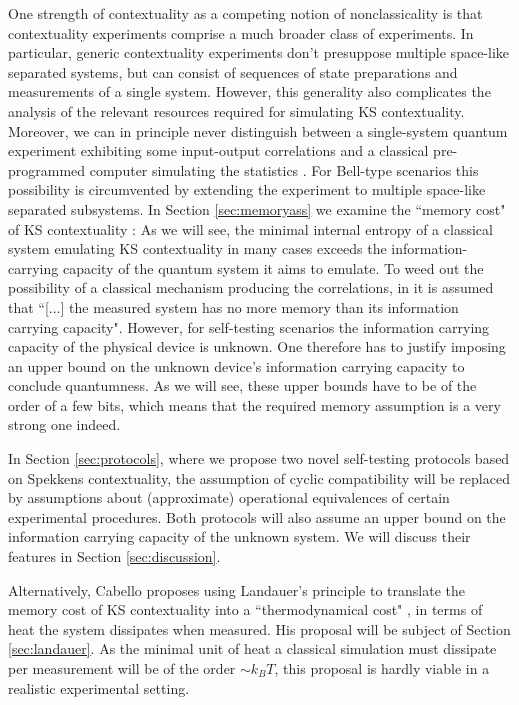 One strength of contextuality as a competing notion of nonclassicality is that contextuality experiments comprise a much broader class of experiments. In particular, generic contextuality experiments don't presuppose multiple space-like separated systems, but can consist of sequences of state preparations and measurements of a single system. However, this generality also complicates the analysis of the relevant resources required for simulating KS contextuality. Moreover, we can in principle never distinguish between a single-system quantum experiment exhibiting some input-output correlations and a classical pre-programmed computer simulating the statistics \cite{Supic2020}. For Bell-type scenarios this possibility is circumvented by extending the experiment to multiple space-like separated subsystems. In Section \ref{sec:memoryass} we examine the ``memory cost" of KS contextuality \cite{Cabello2018,Kleinmann2011}: As we will see, the minimal internal entropy of a classical system emulating KS contextuality in many cases exceeds the information-carrying capacity of the quantum system it aims to emulate. To weed out the possibility of a classical mechanism producing the correlations, in \cite{Bharti2019} it is assumed that ``[$\dots$] the measured system has no more memory than its information carrying capacity".
However, for self-testing scenarios the information carrying capacity of the physical device is unknown.
One therefore has to justify imposing an upper bound on the unknown device's information carrying capacity to conclude quantumness. As we will see, these upper bounds have to be of the order of a few bits, which means that the required memory assumption is a very strong one indeed. 

In Section \ref{sec:protocols}, where we propose two novel self-testing protocols based on Spekkens contextuality, the assumption of cyclic compatibility will be replaced by assumptions about (approximate) operational equivalences of certain experimental procedures. Both protocols will also assume an upper bound on the information carrying capacity of the unknown system. We will discuss their features in Section \ref{sec:discussion}.

Alternatively, Cabello proposes using Landauer's principle \cite{Cabello2018} to translate the memory cost of KS contextuality into a ``thermodynamical cost" \cite{Wiesner2012,Cabello2016}, in terms of heat the system dissipates when measured. His proposal will be subject of Section \ref{sec:landauer}. As the minimal unit of heat a classical simulation must dissipate per measurement will be of the order $\sim k_BT$, this proposal is hardly viable in a realistic experimental setting.


